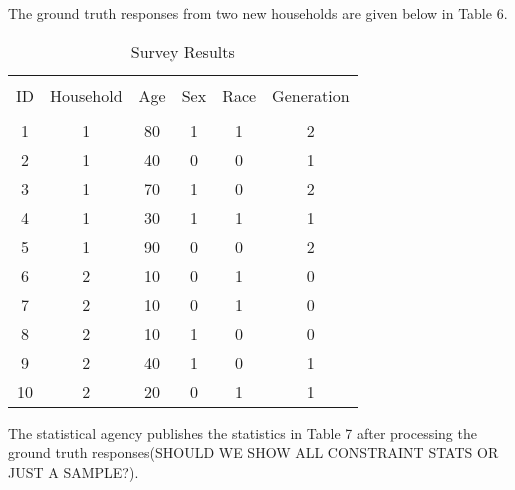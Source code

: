\documentclass[jou,apacite]{apa6}
\begin{document}
The ground truth responses from two new households are given below in Table 6.
\begin{table}[b]
\caption{Survey Results}\label{tab6}
\begin{tabular}{c|c|c|c|c|c}
\hline\\[-1.5ex]
ID & Household & Age & Sex & Race & Generation \\[0.5ex]
\hline\\[-1.5ex]
1 & 1 & 80 & 1 & 1 & 2  \\[0.5ex]
2 & 1 & 40 & 0 & 0 & 1  \\[0.5ex]
3 & 1 & 70 & 1 & 0 & 2  \\[0.5ex]
4 & 1 & 30 & 1 & 1 & 1  \\[0.5ex]
5 & 1 & 90 & 0 & 0 & 2  \\[0.5ex]
6 & 2 & 10 & 0 & 1 & 0  \\[0.5ex]
7 & 2 & 10 & 0 & 1 & 0  \\[0.5ex]
8 & 2 & 10 & 1 & 0 & 0  \\[0.5ex]
9 & 2 & 40 & 1 & 0 & 1 \\[0.5ex]
10 & 2 & 20 & 0 & 1 & 1 \\[0.5ex]
\hline
\end{tabular}
\end{table}

The statistical agency publishes the statistics in Table 7 after processing the ground truth responses(SHOULD WE SHOW ALL CONSTRAINT STATS OR JUST A SAMPLE?).
\end{document}
